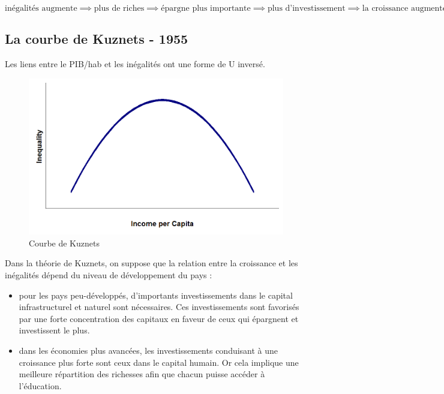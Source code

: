 \documentclass[11pt,a4paper]{article}
\begin{document}
\begin{dmath}
\text{inégalités augmente} \implies \text{plus de riches} \implies \text{épargne plus importante} \implies \text{plus d'investissement} \implies \text{la croissance augmente}
\end{dmath}

\subsection{La courbe de Kuznets - 1955}

Les liens entre le PIB/hab et les inégalités ont une forme de \og U \fg inversé.

\begin{figure}[h!]
\begin{center}
\includegraphics[scale=0.2]{Kuznets_curve.png}
\caption{Courbe de Kuznets}
\end{center}
\end{figure}

Dans la théorie de Kuznets, on suppose que la relation entre la croissance et les inégalités dépend du niveau de développement du pays : 

\begin{itemize}
\item pour les pays peu-développés, d'importants investissements dans le capital infrastructurel et naturel sont nécessaires. Ces investissements sont favorisés par une forte concentration des capitaux en faveur de ceux qui épargnent et investissent le plus. 
\item dans les économies plus avancées, les investissements conduisant à une croissance plus forte sont ceux dans le capital humain. Or cela implique une meilleure répartition des richesses afin que chacun puisse accéder à l'éducation. 
\end{itemize}
\end{document}
